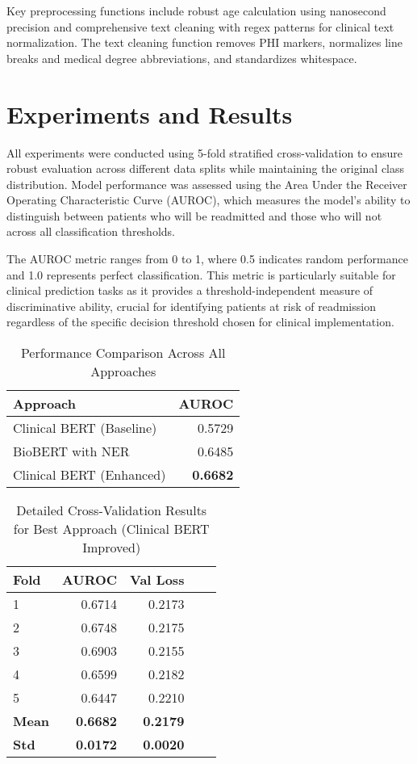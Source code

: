 \documentclass[11pt,a4paper]{article}
\begin{document}
Key preprocessing functions include robust age calculation using nanosecond precision and comprehensive text cleaning with regex patterns for clinical text normalization. The text cleaning function removes PHI markers, normalizes line breaks and medical degree abbreviations, and standardizes whitespace.

\section{Experiments and Results}

All experiments were conducted using 5-fold stratified cross-validation to ensure robust evaluation across different data splits while maintaining the original class distribution. Model performance was assessed using the Area Under the Receiver Operating Characteristic Curve (AUROC), which measures the model's ability to distinguish between patients who will be readmitted and those who will not across all classification thresholds.

The AUROC metric ranges from 0 to 1, where 0.5 indicates random performance and 1.0 represents perfect classification. This metric is particularly suitable for clinical prediction tasks as it provides a threshold-independent measure of discriminative ability, crucial for identifying patients at risk of readmission regardless of the specific decision threshold chosen for clinical implementation.

\begin{table}[H]
\centering
\caption{Performance Comparison Across All Approaches}
\begin{tabular}{@{}lr@{}}
\toprule
\textbf{Approach} & \textbf{AUROC} \\
\midrule
Clinical BERT (Baseline) & 0.5729 \\
BioBERT with NER & 0.6485 \\
Clinical BERT (Enhanced) & \textbf{0.6682} \\
\bottomrule
\end{tabular}
\end{table}

\begin{table}[H]
\centering
\caption{Detailed Cross-Validation Results for Best Approach (Clinical BERT Improved)}
\begin{tabular}{@{}lrrrr@{}}
\toprule
\textbf{Fold} & \textbf{AUROC} & \textbf{Val Loss} \\
\midrule
1 & 0.6714 & 0.2173 \\
2 & 0.6748 & 0.2175 \\
3 & 0.6903 & 0.2155 \\
4 & 0.6599 & 0.2182 \\
5 & 0.6447 & 0.2210 \\
\midrule
\textbf{Mean} & \textbf{0.6682} & \textbf{0.2179} \\
\textbf{Std} & \textbf{0.0172} & \textbf{0.0020} \\
\bottomrule
\end{tabular}
\end{table}
\end{document}
